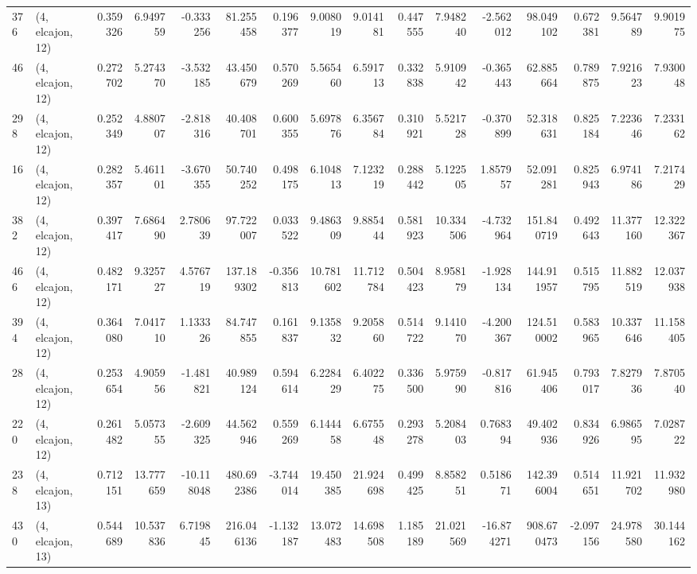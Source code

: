 \begin{tabular}{llrrrrrrrrrrrrrr}
376 &  (4, elcajon, 12) &   0.359326 &   6.949759 &  -0.333256 &    81.255458 &   0.196377 &   9.008019 &   9.014181 &  0.447555 &   7.948240 &  -2.562012 &    98.049102 &  0.672381 &   9.564789 &   9.901975 \\
46  &  (4, elcajon, 12) &   0.272702 &   5.274370 &  -3.532185 &    43.450679 &   0.570269 &   5.565460 &   6.591713 &  0.332838 &   5.910942 &  -0.365443 &    62.885664 &  0.789875 &   7.921623 &   7.930048 \\
298 &  (4, elcajon, 12) &   0.252349 &   4.880707 &  -2.818316 &    40.408701 &   0.600355 &   5.697876 &   6.356784 &  0.310921 &   5.521728 &  -0.370899 &    52.318631 &  0.825184 &   7.223646 &   7.233162 \\
16  &  (4, elcajon, 12) &   0.282357 &   5.461101 &  -3.670355 &    50.740252 &   0.498175 &   6.104813 &   7.123219 &  0.288442 &   5.122505 &   1.857957 &    52.091281 &  0.825943 &   6.974186 &   7.217429 \\
382 &  (4, elcajon, 12) &   0.397417 &   7.686490 &   2.780639 &    97.722007 &   0.033522 &   9.486309 &   9.885444 &  0.581923 &  10.334506 &  -4.732964 &   151.840719 &  0.492643 &  11.377160 &  12.322367 \\
466 &  (4, elcajon, 12) &   0.482171 &   9.325727 &   4.576719 &   137.189302 &  -0.356813 &  10.781602 &  11.712784 &  0.504423 &   8.958179 &  -1.928134 &   144.911957 &  0.515795 &  11.882519 &  12.037938 \\
394 &  (4, elcajon, 12) &   0.364080 &   7.041710 &   1.133326 &    84.747855 &   0.161837 &   9.135832 &   9.205860 &  0.514722 &   9.141070 &  -4.200367 &   124.510002 &  0.583965 &  10.337646 &  11.158405 \\
28  &  (4, elcajon, 12) &   0.253654 &   4.905956 &  -1.481821 &    40.989124 &   0.594614 &   6.228429 &   6.402275 &  0.336500 &   5.975990 &  -0.817816 &    61.945406 &  0.793017 &   7.827936 &   7.870540 \\
220 &  (4, elcajon, 12) &   0.261482 &   5.057355 &  -2.609325 &    44.562946 &   0.559269 &   6.144458 &   6.675548 &  0.293278 &   5.208403 &   0.768394 &    49.402936 &  0.834926 &   6.986595 &   7.028722 \\
238 &  (4, elcajon, 13) &   0.712151 &  13.777659 & -10.118048 &   480.692386 &  -3.744014 &  19.450385 &  21.924698 &  0.499425 &   8.858251 &   0.518671 &   142.396004 &  0.514651 &  11.921702 &  11.932980 \\
430 &  (4, elcajon, 13) &   0.544689 &  10.537836 &   6.719845 &   216.046136 &  -1.132187 &  13.072483 &  14.698508 &  1.185189 &  21.021569 & -16.874271 &   908.670473 & -2.097156 &  24.978580 &  30.144162 \\

\end{tabular}
